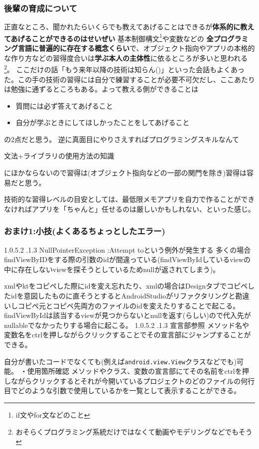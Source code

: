 \documentclass[dvipdfmx,jb5]{jarticle}
\makeatletter
\newcommand{\subsubsubsection}{\@startsection{paragraph}{4}{\z@}%
    {1.0\Cvs \@plus.5\Cdp \@minus.2\Cdp}%
    {.1\Cvs \@plus.3\Cdp}%
    {\reset@font}
  }
\makeatother
\begin{document}
\subsubsection{後輩の育成について}
正直なところ、聞かれたらいくらでも教えてあげることはできるが\textbf{\gtfamily 体系的に教えてあげることができるのはせいぜい} 基本制御構文\footnote{if文やfor文などのこと}や変数などの
\textbf{\gtfamily 全プログラミング言語に普遍的に存在する概念くらい}で、オブジェクト指向やアプリの本格的な作り方などの習得度合いは\textbf{\gtfamily 学ぶ本人の主体性}に依るところが多いと思われる\footnote{おそらくプログラミング系統だけではなくて動画やモデリングなどでもそう}。
ここだけの話「もう来年以降の技術は知らん()」といった会話もよくあった。この手の技術の習得には自分で練習することが必要不可欠だし、ここあたりは勉強に通ずるところもある。よって教える側ができることは
 \begin{itemize}
 \item 質問には必ず答えてあげること
 \item 自分が学ぶときにしてほしかったことをしてあげること
 \end{itemize}
の2点だと思う。
逆に真面目にやりさえすればプログラミングスキルなんて\par
文法+ライブラリの使用方法の知識\par
にほかならないので習得は(オブジェクト指向などの一部の関門を除き)習得は容易だと思う。\par
技術的な習得レベルの目安としては、最低限メモアプリを自力で作ることができなければアプリを「ちゃんと」任せるのは厳しいかもしれない、といった感じ。
 \subsubsection{おまけ1:小技(よくあるちょっとしたエラー)}
 \subsubsubsection{NullPointerException :Attempt toという例外が発生する}
 多くの場合findViewByIDをする際の引数のidが間違っている(findViewByIdしているviewの中に存在しないviewを探そうとしているためnullが返されてしまう)。\par
xmlやktをコピペした際にidを変え忘れたり、xmlの場合はDesignタブでコピペしたidを意図したものに直そうとするとAndroidStudioがリファクタリングと勘違いしコピペ元とコピペ先両方のファイルのidを変えたりすることで起こる。findViewByIdは該当するviewが見つからないとnullを返す(らしい)ので代入先がnullableでなかったりする場合に起こる。
 \subsubsubsection{宣言部参照}
 メソッド名や変数名をctrlを押しながらクリックすることでその宣言部にジャンプすることができる。\par
自分が書いたコードでなくても(例えば\texttt{android.view.View}クラスなどでも)可能。
・使用箇所確認
メソッドやクラス、変数の宣言部にてその名前をctrlを押しながらクリックするとそれが今開いているプロジェクトのどのファイルの何行目でどのような引数で使用しているかを一覧として表示することができる。
\end{document}
